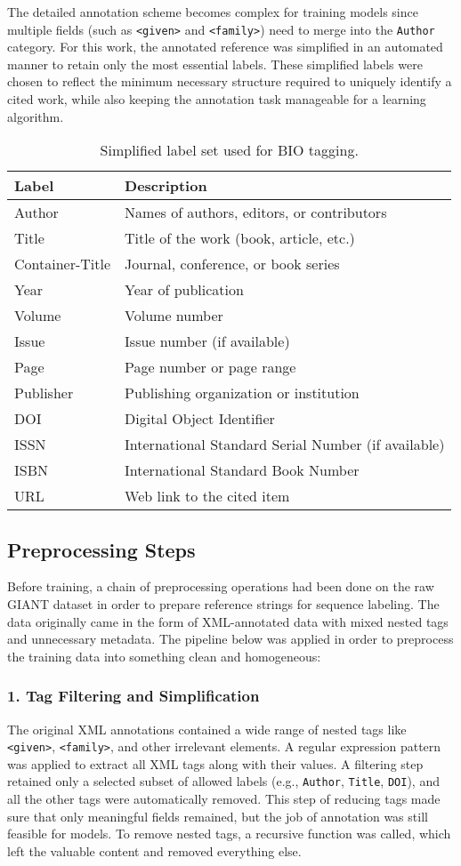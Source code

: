 The detailed annotation scheme becomes complex for training models since multiple fields (such as \texttt{<given>} and \texttt{<family>}) need to merge into the \texttt{Author} category.
For this work, the annotated reference was simplified in an automated manner to retain only the most essential labels. These simplified labels were chosen to reflect the minimum necessary structure required to uniquely identify a cited work, while also keeping the annotation task manageable for a learning algorithm.
\begin{table}[h]
\centering
\begin{tabular}{ll}
\textbf{Label} & \textbf{Description} \\
\hline
Author & Names of authors, editors, or contributors \\
Title & Title of the work (book, article, etc.) \\
Container-Title & Journal, conference, or book series \\
Year & Year of publication \\
Volume & Volume number \\
Issue & Issue number (if available) \\
Page & Page number or page range \\
Publisher & Publishing organization or institution \\
DOI & Digital Object Identifier \\
ISSN & International Standard Serial Number (if available) \\
ISBN & International Standard Book Number \\
URL & Web link to the cited item \\
\end{tabular}
\caption{Simplified label set used for BIO tagging.}
\label{tab:labels}
\end{table}

\subsection{Preprocessing Steps}
Before training, a chain of preprocessing operations had been done on the raw GIANT dataset in order to prepare reference strings for sequence labeling. The data originally came in the form of XML-annotated data with mixed nested tags and unnecessary metadata. The pipeline below was applied in order to preprocess the training data into something clean and homogeneous:
\subsubsection{1. Tag Filtering and Simplification}
The original XML annotations contained a wide range of nested tags like \texttt{<given>}, \texttt{<family>}, and other irrelevant elements. A regular expression pattern was applied to extract all XML tags along with their values. A filtering step retained only a selected subset of allowed labels (e.g., \texttt{Author}, \texttt{Title}, \texttt{DOI}), and all the other tags were automatically removed.
This step of reducing tags made sure that only meaningful fields remained, but the job of annotation was still feasible for models. To remove nested tags, a recursive function was called, which left the valuable content and removed everything else.

